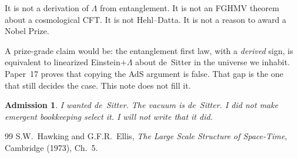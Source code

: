 \documentclass[11pt]{article}
\newtheorem*{admission}{Admission}
\begin{document}
It is not a derivation of $\Lambda$ from entanglement. It is not
an FGHMV theorem about a cosmological CFT. It is not Hehl--Datta.
It is not a reason to award a Nobel Prize.

A prize-grade claim would be: the entanglement first law, with a
\emph{derived} sign, is equivalent to linearized
Einstein$+\Lambda$ about de~Sitter in the universe we inhabit.
Paper~17 proves that copying the AdS argument is false. That gap
is the one that still decides the case. This note does not fill
it.

\begin{admission}
I wanted de~Sitter. The vacuum \emph{is} de~Sitter. I did not
make emergent bookkeeping select it. I will not write that it
did.
\end{admission}

\begin{thebibliography}{99}
S.W.~Hawking and G.F.R.~Ellis,
\emph{The Large Scale Structure of Space-Time},
Cambridge (1973), Ch.~5.
\end{thebibliography}
\end{document}
